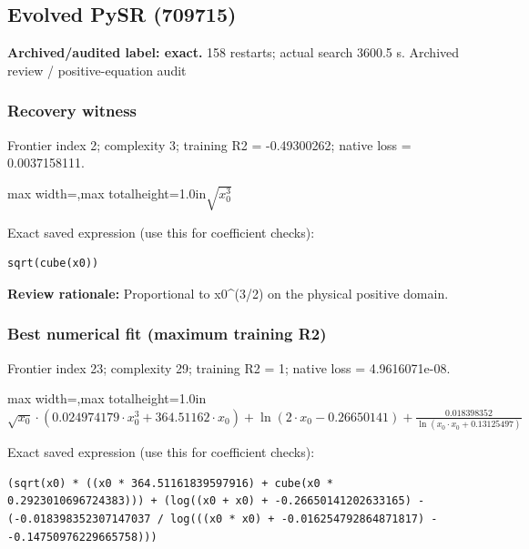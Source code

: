 \documentclass[10pt,letterpaper,landscape]{article}
\begin{document}
\begin{minipage}[t]{0.485\textwidth}
\subsection*{Evolved PySR (709715)}
\textbf{Archived/audited label: exact.} 158 restarts; actual search 3600.5 s.
{\small Archived review / positive-equation audit}
\subsubsection*{Recovery witness}
Frontier index 2; complexity 3; training R2 = -0.49300262; native loss = 0.0037158111.
\begin{center}\begin{adjustbox}{max width=\linewidth,max totalheight=1.0in}$\displaystyle \sqrt{x_{0}^{3}}$\end{adjustbox}\end{center}
{\scriptsize Exact saved expression (use this for coefficient checks):}
\begin{lstlisting}
sqrt(cube(x0))
\end{lstlisting}
{\small\textbf{Review rationale:} Proportional to x0\textasciicircum{}(3/2) on the physical positive domain.}
\subsubsection*{Best numerical fit (maximum training R2)}
Frontier index 23; complexity 29; training R2 = 1; native loss = 4.9616071e-08.
\begin{center}\begin{adjustbox}{max width=\linewidth,max totalheight=1.0in}$\displaystyle \sqrt{x_{0}} \cdot \left(0.024974179 \cdot x_{0}^{3} + 364.51162 \cdot x_{0}\right) + \ln{\left(2 \cdot x_{0} - 0.26650141 \right)} + \frac{0.018398352}{\ln{\left(x_{0} \cdot x_{0} + 0.13125497 \right)}}$\end{adjustbox}\end{center}
{\scriptsize Exact saved expression (use this for coefficient checks):}
\begin{lstlisting}
(sqrt(x0) * ((x0 * 364.51161839597916) + cube(x0 * 0.2923010696724383))) + (log((x0 + x0) + -0.26650141202633165) - (-0.018398352307147037 / log(((x0 * x0) + -0.016254792864871817) - -0.14750976229665758)))
\end{lstlisting}
\end{minipage}
\clearpage{}\label{kepler-10009}
\end{document}
